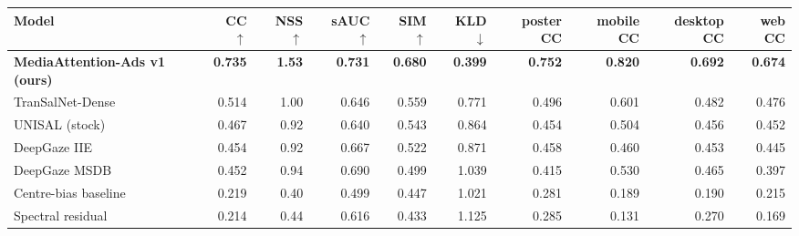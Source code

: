 \begin{tabular}{lrrrrrrrrr}
\toprule
Model & CC $\uparrow$ & NSS $\uparrow$ & sAUC $\uparrow$ & SIM $\uparrow$ & KLD $\downarrow$ & poster CC & mobile CC & desktop CC & web CC \\
\midrule
\textbf{MediaAttention-Ads v1 (ours)} & \textbf{0.735} & \textbf{1.53} & \textbf{0.731} & \textbf{0.680} & \textbf{0.399} & \textbf{0.752} & \textbf{0.820} & \textbf{0.692} & \textbf{0.674} \\
TranSalNet-Dense & 0.514 & 1.00 & 0.646 & 0.559 & 0.771 & 0.496 & 0.601 & 0.482 & 0.476 \\
UNISAL (stock) & 0.467 & 0.92 & 0.640 & 0.543 & 0.864 & 0.454 & 0.504 & 0.456 & 0.452 \\
DeepGaze IIE & 0.454 & 0.92 & 0.667 & 0.522 & 0.871 & 0.458 & 0.460 & 0.453 & 0.445 \\
DeepGaze MSDB & 0.452 & 0.94 & 0.690 & 0.499 & 1.039 & 0.415 & 0.530 & 0.465 & 0.397 \\
Centre-bias baseline & 0.219 & 0.40 & 0.499 & 0.447 & 1.021 & 0.281 & 0.189 & 0.190 & 0.215 \\
Spectral residual & 0.214 & 0.44 & 0.616 & 0.433 & 1.125 & 0.285 & 0.131 & 0.270 & 0.169 \\
\bottomrule
\end{tabular}
